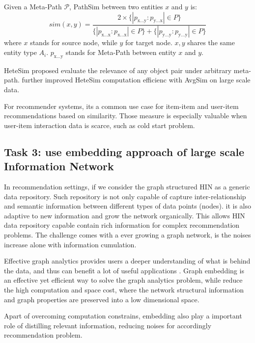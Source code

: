 \theoremstyle{definition}
\begin{definition}\label{def:pathsim}
    Given a Meta-Path $\mathcal{P}$, PathSim between two entities $x$ and $y$ is:
    \begin{equation}
        sim(x,y)=\frac{2 \times \{|p_\text{x...y}:p_\text{y...x}| \in P\}}{\{|p_\text{x...x}:p_\text{x...x}| \in P\} + \{|p_\text{y...y}:p_\text{y...y}| \in P\}}
    \end{equation}
    where $x$ stands for source node, while $y$ for target node. 
    $x, y$ shares the same entity type $A_i$.
    $p_\text{x...y}$ stands for Meta-Path between entity $x$ and $y$. 
\end{definition}

HeteSim \citep{Shi2013HeteSim} proposed evaluate the relevance of any object pair under arbitrary meta-path. \citet{xiao2016avgsim} further improved HeteSim computation efficienc with AvgSim on large scale data.

For recommender systems, its a common use case for item-item and user-item recommendations based on similarity. Those measure is especially valuable when user-item interaction data is scarce, such as cold start problem. 

\subsection{Task 3: use embedding approach of large scale Information Network}

In recommendation settings, if we consider the graph structured HIN as a generic data repository. Such repository is not only capable of capture inter-relationship and semantic information between different types of data points (nodes). it is also adaptive to new information and grow the network organically. This allows HIN data repository capable contain rich information for complex recommendation problems. The challenge comes with a ever growing a graph network, is the noises increase alone with information cumulation.

Effective graph analytics provides users a deeper understanding of what is behind the data, and thus can benefit a lot of useful applications \citep{Cai2018}. Graph embedding is an effective yet efficient way to solve the graph analytics problem, while reduce the high computation and space cost, where the network structural information and graph properties are preserved into a low dimensional space.

Apart of overcoming computation constrains, embedding also play a important role of distilling relevant information, reducing noises for accordingly recommendation problem.

